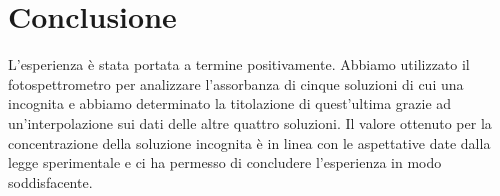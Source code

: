 \section*{Conclusione}

L'esperienza è stata portata a termine positivamente. Abbiamo utilizzato il fotospettrometro per analizzare l'assorbanza di cinque soluzioni di cui una incognita e abbiamo determinato la titolazione di quest'ultima grazie ad un'interpolazione sui dati delle altre quattro soluzioni.
Il valore ottenuto per la concentrazione della soluzione incognita è in linea con le aspettative date dalla legge sperimentale e ci ha permesso di concludere l'esperienza in modo soddisfacente.